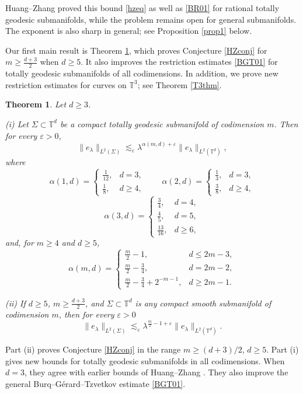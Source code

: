\documentclass[11pt,reqno]{amsart}
\newtheorem{theorem}{Theorem}[section]
\numberwithin{equation}{section}
\newcommand{\1}{\textbf{1}}
\newcommand{\eps}{\varepsilon}
\begin{document}
	Huang--Zhang proved this
	bound \eqref{hzeq} as well as \eqref{BR01} for rational totally geodesic submanifolds, while the problem remains
	open for general submanifolds.  The exponent is also sharp in general; see
	Proposition \ref{prop1} below.
	
	Our first main result is Theorem \ref{thm1}, which proves Conjecture \ref{HZconj} for $m\ge \frac{d+3}2$ when $d\ge5$. It also improves the restriction estimates \eqref{BGT01} for totally geodesic submanifolds of all codimensions. In addition, we prove new restriction estimates for curves on $\mathbb{T}^3$; see Theorem \ref{T3thm}.
	
	
	\begin{theorem}\label{thm1}
		Let \(d\ge3\).
		
		\emph{(i)} Let \(\Sigma\subset\mathbb T^d\) be a compact totally geodesic
		submanifold of codimension \(m\).  Then for every \(\eps>0\),
		\[
		\|e_\lambda\|_{L^2(\Sigma)}
		\lesssim_\eps
		\lambda^{\alpha(m,d)+\eps}
		\|e_\lambda\|_{L^2(\mathbb T^d)},
		\]
		where
		\[
		\alpha(1,d)=
		\begin{cases}
			\frac1{12},& d=3,\\
			\frac18,& d\ge4,
		\end{cases}
		\qquad
		\alpha(2,d)=
		\begin{cases}
			\frac13,& d=3,\\
			\frac38,& d\ge4,
		\end{cases}
		\]
		\[
		\alpha(3,d)=
		\begin{cases}
			\frac34,& d=4,\\
			\frac45,& d=5,\\
			\frac{13}{16},& d\ge6,
		\end{cases}
		\]
		and, for \(m\ge4\) and \(d\ge5\),
		\[
		\alpha(m,d)=
		\begin{cases}
			\frac m2-1,& d\le 2m-3,\\
			\frac m2-\frac34,& d=2m-2,\\
			\frac m2-\frac34+2^{-m-1},& d\ge 2m-1.
		\end{cases}
		\]
		
		\emph{(ii)} If \(d\ge5\), \(m\ge \frac{d+3}2\), and
		\(\Sigma\subset\mathbb T^d\) is any compact smooth submanifold of
		codimension \(m\), then for every \(\eps>0\)
		\[
		\|e_\lambda\|_{L^2(\Sigma)}
		\lesssim_\eps
		\lambda^{\frac m2-1+\eps}
		\|e_\lambda\|_{L^2(\mathbb T^d)}.
		\]
	\end{theorem}
	
	Part (ii) proves Conjecture \ref{HZconj} in the range
	\(m\ge(d+3)/2\), \(d\ge5\).  Part (i) gives new bounds for totally geodesic
	submanifolds in all codimensions.  When \(d=3\), they agree with earlier bounds of Huang--Zhang
	\cite[Theorem 4]{hzapde}. They also improve the general
	Burq--G\'erard--Tzvetkov estimate \eqref{BGT01}.
	
\end{document}

